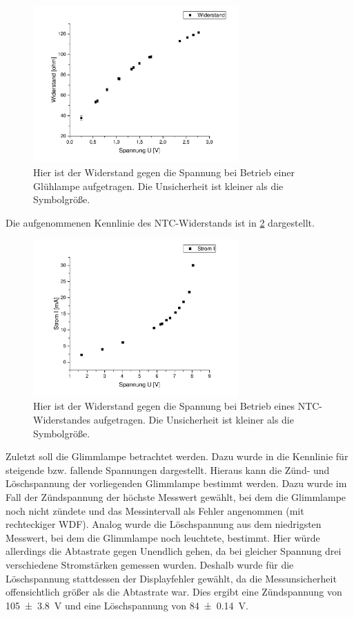 \documentclass[
	a4paper,
	12pt,
	pagesize,
	ngerman
]{scrartcl}
\begin{document}
	\begin{figure}[H]
		\includegraphics[width=0.7\textwidth]{Glueh_Wider}
		\centering
		\caption{Hier ist der Widerstand gegen die Spannung bei Betrieb einer Glühlampe aufgetragen. Die Unsicherheit ist kleiner als die Symbolgröße.}
		\label{Glueh_Wider}
		\centering
	\end{figure}
	Die aufgenommenen Kennlinie des NTC-Widerstands ist in \cref{ntc} dargestellt.
	\begin{figure}[H]
		\includegraphics[width=0.7\textwidth]{ntc}
		\centering
		\caption{Hier ist der Widerstand gegen die Spannung bei Betrieb eines NTC-Widerstandes aufgetragen. Die Unsicherheit ist kleiner als die Symbolgröße.}
		\label{ntc}
		\centering
	\end{figure}
	Zuletzt soll die Glimmlampe betrachtet werden.
	Dazu wurde in  die Kennlinie für steigende bzw. fallende Spannungen dargestellt.
	Hieraus kann die Zünd- und Löschspannung der vorliegenden Glimmlampe bestimmt werden.
	Dazu wurde im Fall der Zündspannung der höchste Messwert gewählt, bei dem die Glimmlampe noch nicht zündete und das Messintervall als Fehler angenommen (mit rechteckiger WDF).
	Analog wurde die Löschspannung aus dem niedrigsten Messwert, bei dem die Glimmlampe noch leuchtete, bestimmt.
	Hier würde allerdings die Abtastrate gegen Unendlich gehen, da bei gleicher Spannung drei verschiedene Stromstärken gemessen wurden.
	Deshalb wurde für die Löschspannung stattdessen der Displayfehler gewählt, da die Messunsicherheit offensichtlich größer als die Abtastrate war.
	Dies ergibt eine Zündspannung von \SI{105\pm3,8}{V} und eine Löschspannung von \SI{84\pm 0,14}{V}.
	
\end{document}
